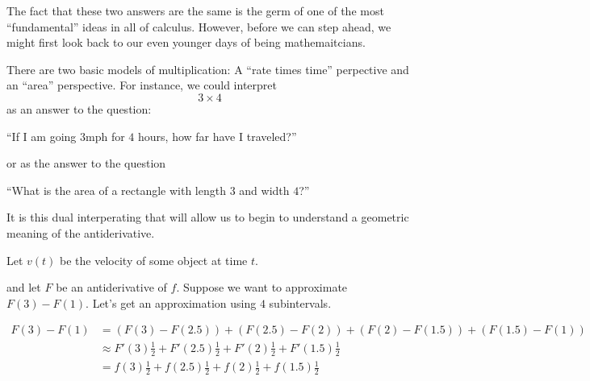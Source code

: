 \documentclass{ximera}
\begin{document}
The fact that these two answers are the same is the germ of one of the
most ``fundamental'' ideas in all of calculus. However, before we can
step ahead, we might first look back to our even younger days of being mathemaitcians.

  There are two basic models of multiplication: A ``rate times time''
  perpective and an ``area'' perspective.  For instance, we could
  interpret
  \[
  3\times 4
  \]
  as an answer to the question:
  \begin{center}
    ``If I am going $3 \textrm{mph}$ for $4$ hours, how far have I
    traveled?''
  \end{center}
  or as the answer to the question
  \begin{center}
    ``What is the area of a rectangle with length $3$ and width $4$?''
  \end{center}

It is this dual interperating that will allow us to begin to
understand a geometric meaning of the antiderivative.

Let $v(t)$ be the velocity of some object at time $t$.
\begin{image}
\end{image}
and let $F$ be an antiderivative of $f$.  Suppose we want to approximate $F(3)
- F(1)$.  Let's get an approximation using $4$ subintervals.
  
  \begin{align*}F(3) - F(1) &= (F(3) - F(2.5))+(F(2.5) - F(2))+(F(2) - F(1.5))+(F(1.5) - F(1))\\
  &\approx F'(3)\frac{1}{2}+F'(2.5)\frac{1}{2}+F'(2)\frac{1}{2}+F'(1.5)\frac{1}{2}\\
  &=f(3)\frac{1}{2}+f(2.5)\frac{1}{2}+f(2)\frac{1}{2}+f(1.5)\frac{1}{2}
  \end{align*}
  
\end{document}
